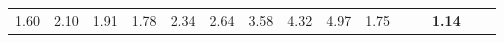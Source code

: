 \begin{tabular}{ll|rrrrrrrrr|rrrr}
  


  
  1.60 & 2.10 & 1.91 & 1.78 & 2.34 & 2.64 & 3.58 & 4.32 & 4.97 & 1.75 &  &  & \textbf{1.14} \\


\end{tabular}
